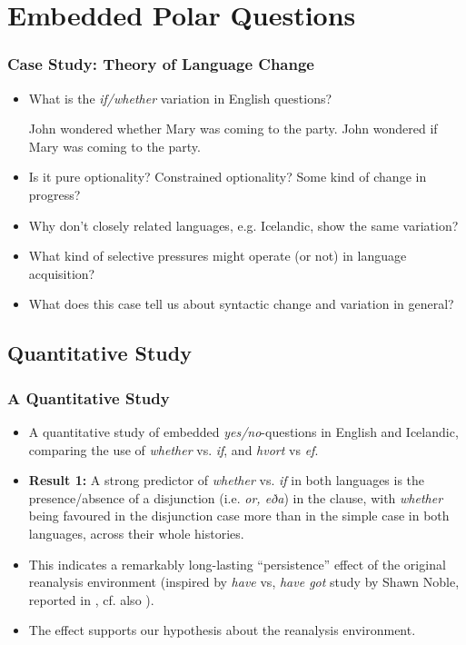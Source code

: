 \documentclass[hyperref={pdfpagelabels=false}]{beamer}
\begin{document}
\section{Embedded Polar Questions}

\begin{frame}
\frametitle{Case Study: Theory of Language Change}
\begin{itemize}
	\item What is the \textsl{if/whether} variation in English questions? \\ \citep{baileywallenbergwurff2012}
	\begin{exe}
		\ex John wondered whether Mary was coming to the party.
		\ex John wondered if Mary was coming to the party.
	\end{exe}
	\item Is it pure optionality? Constrained optionality? Some kind of change in progress?
	\item Why don't closely related languages, e.g. Icelandic, show the same variation?
	\item What kind of selective pressures might operate (or not) in language acquisition?
	\item What does this case tell us about syntactic change and variation in general?
	
\end{itemize}
\end{frame}





\subsection{Quantitative Study}

\begin{frame}
\frametitle{A Quantitative Study}
\begin{itemize}
	\item A quantitative study of embedded \textsl{yes/no}-questions in English and Icelandic, comparing the use of \textsl{whether} vs. \textsl{if}, and \textsl{hvort} vs \textsl{ef}.
	\item \textbf{Result 1:} A strong predictor of \textsl{whether} vs. \textsl{if} in both languages is the presence/absence of a disjunction (i.e. \textsl{or, eða}) in the clause, with \textsl{whether} being favoured in the disjunction case more than in the simple case in both languages, across their whole histories.
	\item This indicates a remarkably long-lasting ``persistence'' effect of the original reanalysis environment (inspired by \textsl{have} vs, \textsl{have got} study by Shawn Noble, reported in \citealt{kroch1989}, cf. also \citealt{labov1989}).
	\item The effect supports our hypothesis about the reanalysis environment.
\end{itemize}
\end{frame}
\end{document}
